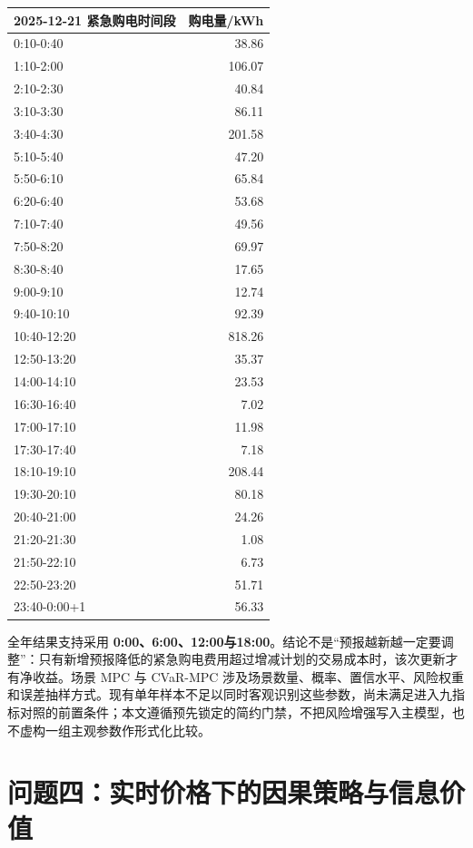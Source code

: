 \documentclass[12pt,a4paper]{ctexart}
\begin{document}
\begin{table}[htbp]
\centering
\small
\begin{tabularx}{\textwidth}{@{}X r@{}}
\toprule
2025-12-21 紧急购电时间段 & 购电量/kWh \\
\midrule
0:10-0:40 & 38.86 \\
1:10-2:00 & 106.07 \\
2:10-2:30 & 40.84 \\
3:10-3:30 & 86.11 \\
3:40-4:30 & 201.58 \\
5:10-5:40 & 47.20 \\
5:50-6:10 & 65.84 \\
6:20-6:40 & 53.68 \\
7:10-7:40 & 49.56 \\
7:50-8:20 & 69.97 \\
8:30-8:40 & 17.65 \\
9:00-9:10 & 12.74 \\
9:40-10:10 & 92.39 \\
10:40-12:20 & 818.26 \\
12:50-13:20 & 35.37 \\
14:00-14:10 & 23.53 \\
16:30-16:40 & 7.02 \\
17:00-17:10 & 11.98 \\
17:30-17:40 & 7.18 \\
18:10-19:10 & 208.44 \\
19:30-20:10 & 80.18 \\
20:40-21:00 & 24.26 \\
21:20-21:30 & 1.08 \\
21:50-22:10 & 6.73 \\
22:50-23:20 & 51.71 \\
23:40-0:00+1 & 56.33 \\
\bottomrule
\end{tabularx}
\end{table}
全年结果支持采用 \textbf{0:00、6:00、12:00与18:00}。结论不是“预报越新越一定要调整”：只有新增预报降低的紧急购电费用超过增减计划的交易成本时，该次更新才有净收益。场景 MPC 与 CVaR-MPC 涉及场景数量、概率、置信水平、风险权重和误差抽样方式。现有单年样本不足以同时客观识别这些参数，尚未满足进入九指标对照的前置条件；本文遵循预先锁定的简约门禁，不把风险增强写入主模型，也不虚构一组主观参数作形式化比较。\par
\section{问题四：实时价格下的因果策略与信息价值}
\end{document}
